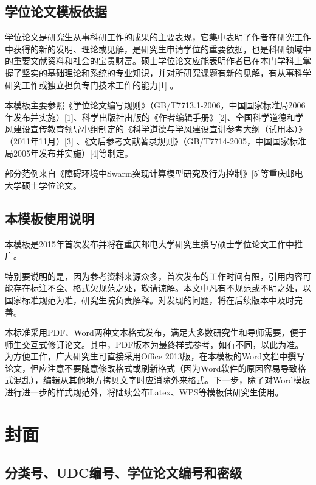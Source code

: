 \documentclass{cqupt_thesis}
\begin{document}
    \subsection{学位论文模板依据}

    学位论文是研究生从事科研工作的成果的主要表现，它集中表明了作者在研究工作中获得的新的发明、理论或见解，是研究生申请学位的重要依据，也是科研领域中的重要文献资料和社会的宝贵财富。硕士学位论文应能表明作者已在本门学科上掌握了坚实的基础理论和系统的专业知识，并对所研究课题有新的见解，有从事科学研究工作或独立担负专门技术工作的能力[1] 。

    本模板主要参照《学位论文编写规则》（GB/T7713.1-2006，中国国家标准局2006年发布并实施）[1]、科学出版社出版的《作者编辑手册》[2]、全国科学道德和学风建设宣传教育领导小组制定的《科学道德与学风建设宣讲参考大纲（试用本）》（2011年11月）[3] 、《文后参考文献著录规则》（GB/T7714-2005，中国国家标准局2005年发布并实施）[4]等制定。

    部分范例来自《障碍环境中Swarm突现计算模型研究及行为控制》[5]等重庆邮电大学硕士学位论文。

    \subsection{本模板使用说明}
    本模板是2015年首次发布并将在重庆邮电大学研究生撰写硕士学位论文工作中推广。

    特别要说明的是，因为参考资料来源众多，首次发布的工作时间有限，引用内容可能存在标注不全、格式欠规范之处，敬请谅解。本文中凡有不规范或不明之处，以国家标准规范为准，研究生院负责解释。对发现的问题，将在后续版本中及时完善。

    本标准采用PDF、Word两种文本格式发布，满足大多数研究生和导师需要，便于师生交互式修订论文。其中，PDF版本为最终样式参考，如有不同，以此为准。为方便工作，广大研究生可直接采用Office 2013版，在本模板的Word文档中撰写论文，但应注意不要随意修改格式或刷新格式（因为Word软件的原因容易导致格式混乱），编辑从其他地方拷贝文字时应消除外来格式。下一步，除了对Word模板进行进一步的样式规范外，将陆续公布Latex、WPS等模板供研究生使用。


    \section{封面}

    \subsection{分类号、UDC编号、学位论文编号和密级}
\end{document}
